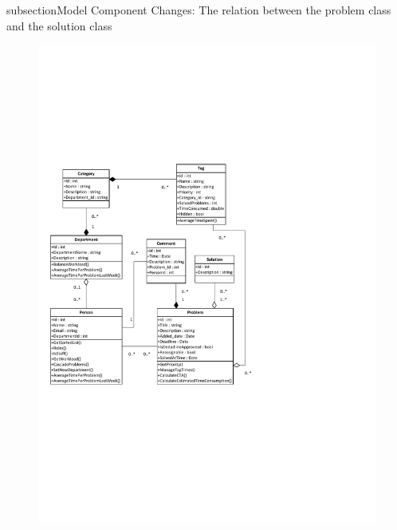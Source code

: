 \*subsection{Model Component}
Changes: The relation between the problem class and the solution class 
	

\begin{figure}[p]%
\includegraphics[clip=true, height=1.0\textwidth, trim=0.5cm 5cm 7.5cm 7cm]{ClassDiagramV3.pdf}%
\label{fig:modelcomponent}
\end{figure}

